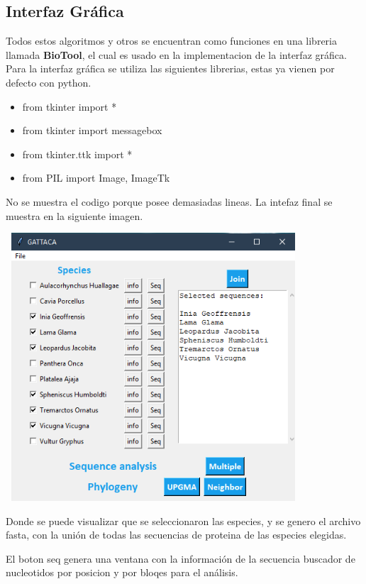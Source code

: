 \documentclass[a4paper]{article}
\begin{document}
\subsection{Interfaz Gráfica}
\noindent Todos estos algoritmos y otros se encuentran como funciones en una libreria llamada \textbf{BioTool}, el cual es usado en la implementacion de la interfaz gráfica.
Para la interfaz gráfica se utiliza las siguientes librerias, estas ya vienen por defecto con python.
\begin{itemize}

\item from tkinter import *
\item from tkinter import messagebox
\item from tkinter.ttk import *
\item from PIL import Image, ImageTk

\end{itemize}
No se muestra el codigo porque posee demasiadas lineas. La intefaz final se muestra en la siguiente imagen.

\begin{center}
	\includegraphics[width=11cm,height=10cm]{InterfazFinal.png}
\end{center}

Donde se puede visualizar que se seleccionaron las especies, y se genero el archivo fasta, con la unión de todas las secuencias de proteina de las especies elegidas.

El boton seq genera una ventana con la información de la secuencia buscador de nucleotidos por posicion y por bloqes para el análisis.
\end{document}
